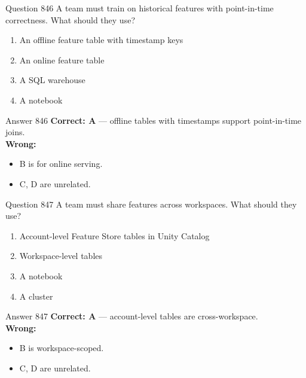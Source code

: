 \documentclass[aspectratio=169,11pt]{beamer}
\begin{document}
	\begin{frame}{Question 846}
		A team must train on historical features with point-in-time correctness. What should they use?
		\begin{enumerate}[label=\Alph*.]
			\item An offline feature table with timestamp keys
			\item An online feature table
			\item A SQL warehouse
			\item A notebook
		\end{enumerate}
	\end{frame}
	\begin{frame}{Answer 846}
		\textbf{Correct: A} --- offline tables with timestamps support point-in-time joins.\\
		\vspace{0.5em}
		\textbf{Wrong:}
		\begin{itemize}
			\item B is for online serving.
			\item C, D are unrelated.
		\end{itemize}
	\end{frame}
	
	\begin{frame}{Question 847}
		A team must share features across workspaces. What should they use?
		\begin{enumerate}[label=\Alph*.]
			\item Account-level Feature Store tables in Unity Catalog
			\item Workspace-level tables
			\item A notebook
			\item A cluster
		\end{enumerate}
	\end{frame}
	\begin{frame}{Answer 847}
		\textbf{Correct: A} --- account-level tables are cross-workspace.\\
		\vspace{0.5em}
		\textbf{Wrong:}
		\begin{itemize}
			\item B is workspace-scoped.
			\item C, D are unrelated.
		\end{itemize}
	\end{frame}
	
\end{document}
